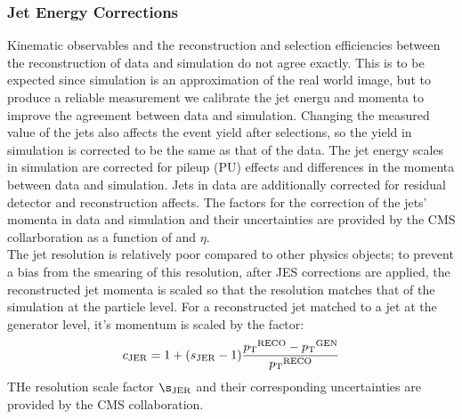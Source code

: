 \subsubsection{Jet Energy Corrections}\label{JEC}
Kinematic observables and the reconstruction and selection efficiencies between the reconstruction of data and simulation do not agree exactly. This is to be expected since simulation is an approximation of the real world image, but to produce a reliable measurement we calibrate the jet energu and momenta to improve the agreement between data and simulation. Changing the measured value of the jets also affects the event yield after selections, so the yield in simulation is corrected to be the same as that of the data. The jet energy scales in simulation are corrected for pileup (PU) effects and differences in the momenta between data and simulation. Jets in data are additionally corrected for residual detector and reconstruction affects. The factors for the correction of the jets' momenta in data and simulation and their uncertainties are provided by the CMS collarboration as a function of \pt and $\eta$.\\
The jet \pt resolution is relatively poor compared to other physics objects; to prevent a bias from the smearing of this resolution, after JES corrections are applied, the reconstructed jet momenta is scaled so that the resolution matches that of the simulation at the particle level. For a reconstructed jet matched to a jet at the generator level, it's momentum is scaled by the factor:
\begin{equation}
  \label{eq:JER}
  c_{\textrm{JER}}=1+(s_{\textrm{JER}}-1)\frac{{p_{\mathrm{T}}}^{\textrm{RECO}}-{p_{\mathrm{T}}}^{\textrm{GEN}}}{{p_{\mathrm{T}}}^{\textrm{RECO}}}
\end{equation}
THe resolution scale factor $\s_{\textrm{JER}}$ and their corresponding uncertainties are provided by the CMS collaboration.
